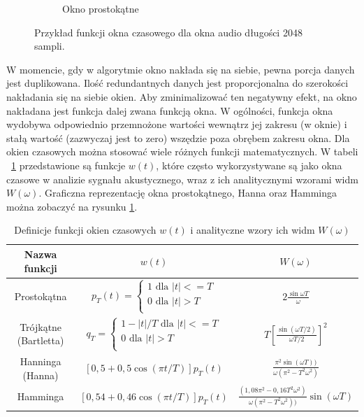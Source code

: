 \documentclass[12pt,a4paper,twoside]{mwart}
\begin{document}
\begin{figure}[t]
\begin{subfigure}{0.49\textwidth}
    \caption{Okno prostokątne}
  \end{subfigure}
  \caption{Przykład funkcji okna czasowego dla okna audio długości 2048 sampli.}
  \label{fig:WindowFunctions}
\end{figure}


W momencie, gdy w algorytmie okno nakłada się na siebie, pewna porcja danych jest duplikowana. Ilość redundantnych danych jest proporcjonalna do szerokości nakładania się na siebie okien. Aby zminimalizować ten negatywny efekt, na okno nakładana jest funkcja dalej zwana funkcją okna. W ogólności, funkcja okna wydobywa odpowiednio przemnożone wartości wewnątrz jej zakresu (w oknie) i stałą wartość (zazwyczaj jest to zero) wszędzie poza obrębem zakresu okna. Dla okien czasowych można stosować wiele różnych funkcji matematycznych. W tabeli ~\ref{tab:definicjeOkien} przedstawione są funkcje $w(t)$, które często wykorzystywane są jako okna czasowe w analizie sygnału akustycznego, wraz z ich analitycznymi wzorami widm $W(\omega)$. Graficzna reprezentację okna prostokątnego, Hanna oraz Hamminga można zobaczyć na rysunku \ref{fig:WindowFunctions}\cite[103, 106]{CyfrowePrzetwarzanieSygnalowOdTeoriiDoZastosowan}\cite{Transcription:Kunieda:Aclos}.

\begin{table}[t]
  \begin{center}
    \begin{tabular}{ |c|c|c| } 
    \hline
    Nazwa funkcji & $w(t)$ & $W(\omega)$\\
    \hline
    Prostokątna & $p_T (t) = \left\{
      \begin{array}{ll}
        1 \text{ dla } |t| <= T\\
        0 \text{ dla } |t| > T\\
      \end{array}
    \right.  $ & $2\frac{\sin \omega T}{\omega}$\\
    \hline
    Trójkątne (Bartletta) & $q_T = \left\{
      \begin{array}{ll}
        1-|t|/T \text{ dla } |t| <= T\\
        0 \text{ dla } |t| > T\\
      \end{array}
    \right. $ & $T[\frac{\sin(\omega T / 2)}{\omega T/2}]^2$\\
    \hline
    Hanninga (Hanna) & $[0,5 + 0,5 \cos(\pi t / T)]p_T (t)$ & 
    $\frac{\pi^2 \sin(\omega T))}{\omega(\pi^2 - T^2 \omega^2)}$\\
    \hline
    Hamminga & $[0,54 + 0,46\cos(\pi t/T)]p_T (t)$ & 
    $\frac{(1,08\pi^2 - 0,16T^2\omega^2)}{\omega(\pi^2 - T^2 \omega^2))}\sin(\omega T)$\\
    \hline
    \end{tabular}
  \end{center}
  \caption{Definicje funkcji okien czasowych $w(t)$ i analityczne wzory ich widm $W(\omega)$}
  \label{tab:definicjeOkien}
\end{table}
\end{document}
